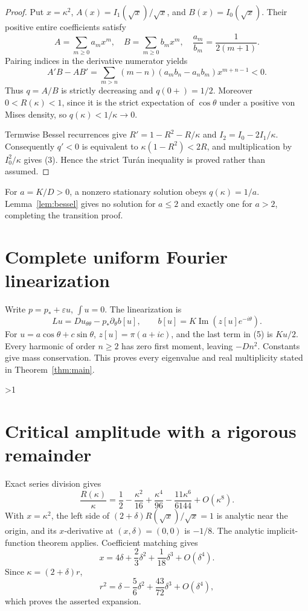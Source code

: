 \documentclass[10pt]{article}
\providecommand{\CRevisionRound}{2}
\theoremstyle{remark}
\begin{document}
\begin{proof}
Put \(x=\kappa^2\), \(A(x)=I_1(\sqrt x)/\sqrt x\), and
\(B(x)=I_0(\sqrt x)\).  Their positive entire coefficients satisfy
\[
 A=\sum_{m\geq0}a_mx^m,\quad B=\sum_{m\geq0}b_mx^m,\quad
 \frac{a_m}{b_m}=\frac1{2(m+1)}.
\]
Pairing indices in the derivative numerator yields
\[
 A'B-AB'=\sum_{m>n}(m-n)(a_mb_n-a_nb_m)x^{m+n-1}<0.       \tag{4}
\]
Thus \(q=A/B\) is strictly decreasing and \(q(0+)=1/2\).  Moreover
\(0<R(\kappa)<1\), since it is the strict expectation of \(\cos\theta\)
under a positive von Mises density, so \(q(\kappa)<1/\kappa\to0\).

Termwise Bessel recurrences give
\(R'=1-R^2-R/\kappa\) and \(I_2=I_0-2I_1/\kappa\).
Consequently \(q'<0\) is equivalent to
\(\kappa(1-R^2)<2R\), and multiplication by \(I_0^2/\kappa\) gives
(3).  Hence the strict Tur\'an inequality is proved rather than assumed.
\end{proof}

For \(a=K/D>0\), a nonzero stationary solution obeys
\(q(\kappa)=1/a\).  Lemma~\ref{lem:bessel} gives no solution for
\(a\leq2\) and exactly one for \(a>2\), completing the transition proof.

\section{Complete uniform Fourier linearization}

Write \(p=p_*+\varepsilon u\), \(\int u=0\).  The linearization is
\[
 Lu=Du_{\theta\theta}-p_*\partial_\theta b[u],\qquad
 b[u]=K\operatorname{Im}(z[u]e^{-i\theta}).               \tag{5}
\]
For \(u=a\cos\theta+c\sin\theta\),
\(z[u]=\pi(a+ic)\), and the last term in (5) is \(Ku/2\).
Every harmonic of order \(n\geq2\) has zero first moment, leaving
\(-Dn^2\).  Constants give mass conservation.  This proves every
eigenvalue and real multiplicity stated in Theorem~\ref{thm:main}.
\fi

\ifnum\CRevisionRound>1
\section{Critical amplitude with a rigorous remainder}

Exact series division gives
\[
 \frac{R(\kappa)}\kappa
 =\frac12-\frac{\kappa^2}{16}+\frac{\kappa^4}{96}
  -\frac{11\kappa^6}{6144}+O(\kappa^8).                  \tag{6}
\]
With \(x=\kappa^2\), the left side of
\((2+\delta)R(\sqrt x)/\sqrt x=1\) is analytic near the origin, and its
\(x\)-derivative at \((x,\delta)=(0,0)\) is \(-1/8\).  The analytic
implicit-function theorem applies.  Coefficient matching gives
\[
 x=4\delta+\frac23\delta^2+\frac1{18}\delta^3+O(\delta^4).
\]
Since \(\kappa=(2+\delta)r\),
\[
 r^2=\delta-\frac56\delta^2+\frac{43}{72}\delta^3+O(\delta^4),
\]
which proves the asserted expansion.
\end{document}
